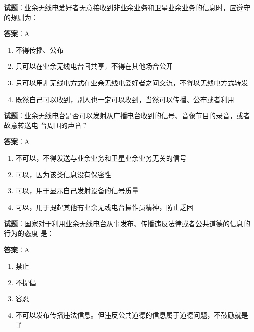 \documentclass{ctexbook}
\begin{document}
\textbf{试题：}业余无线电爱好者无意接收到非业余业务和卫星业余业务的信息时，应遵守的规则为： 

\textbf{答案：}A 

\begin{enumerate}[leftmargin=3em]
  \item 不得传播、公布 

  \item 只可以在业余无线电台间共享，不得在其他场合公开 

  \item 只可以用非无线电方式在业余无线电爱好者之间交流，不得以无线电方式转发 

  \item 既然自己可以收到，别人也一定可以收到，当然可以传播、公布或者利用 

\end{enumerate}





\vspace{1em}

\textbf{试题：}业余无线电台是否可以发射从广播电台收到的信号、音像节目的录音，或者故意转送电
台周围的声音？ 

\textbf{答案：}A 

\begin{enumerate}[leftmargin=3em]
  \item 不可以，不得发送与业余业务和卫星业余业务无关的信号 

  \item 可以，因为该类信息没有保密性 

  \item 可以，用于显示自己发射设备的信号质量 

  \item 可以，用于提起其他有业余无线电台操作员精神，防止乏困 


\end{enumerate}





\vspace{1em}

\textbf{试题：}国家对于利用业余无线电台从事发布、传播违反法律或者公共道德的信息的行为的态度
是： 

\textbf{答案：}A 

\begin{enumerate}[leftmargin=3em]
  \item 禁止 

  \item 不提倡 

  \item 容忍 

  \item 不可以发布传播违法信息。但违反公共道德的信息属于道德问题，不鼓励就是了 

\end{enumerate}
\end{document}
